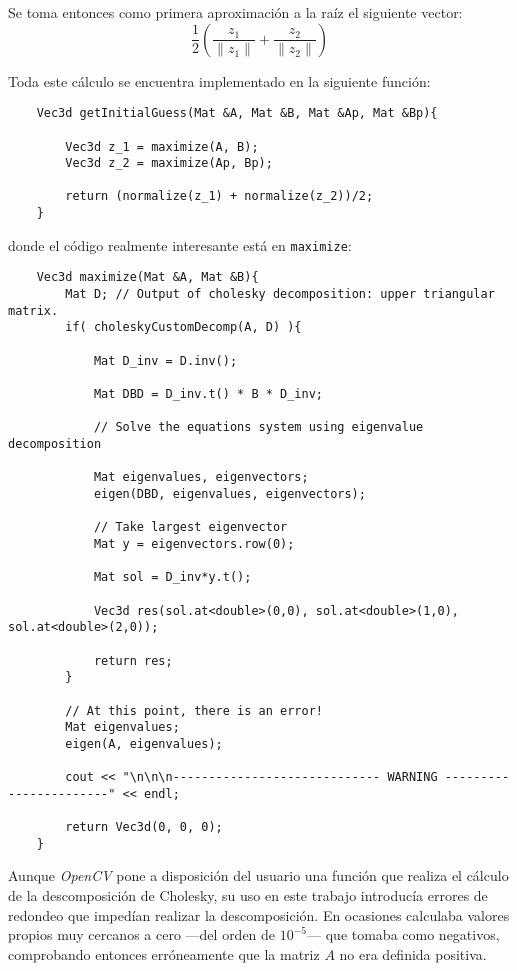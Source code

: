 \documentclass[a4paper, 11pt]{article}
\theoremstyle{definition}
\begin{document}
    Se toma entonces como primera aproximación a la raíz el siguiente vector:
    \[
    \frac{1}{2}\left(\frac{z_1}{\lVert z_1 \rVert} + \frac{z_2}{\lVert z_2 \rVert}\right)
    \]

    Toda este cálculo se encuentra implementado en la siguiente función:
    \begin{lstlisting}
    Vec3d getInitialGuess(Mat &A, Mat &B, Mat &Ap, Mat &Bp){

        Vec3d z_1 = maximize(A, B);
        Vec3d z_2 = maximize(Ap, Bp);

        return (normalize(z_1) + normalize(z_2))/2;
    }
    \end{lstlisting}

    donde el código realmente interesante está en \lstinline{maximize}:
    \begin{lstlisting}
    Vec3d maximize(Mat &A, Mat &B){
        Mat D; // Output of cholesky decomposition: upper triangular matrix.
        if( choleskyCustomDecomp(A, D) ){

            Mat D_inv = D.inv();

            Mat DBD = D_inv.t() * B * D_inv;

            // Solve the equations system using eigenvalue decomposition

            Mat eigenvalues, eigenvectors;
            eigen(DBD, eigenvalues, eigenvectors);

            // Take largest eigenvector
            Mat y = eigenvectors.row(0);

            Mat sol = D_inv*y.t();

            Vec3d res(sol.at<double>(0,0), sol.at<double>(1,0), sol.at<double>(2,0));

            return res;
        }

        // At this point, there is an error!
        Mat eigenvalues;
        eigen(A, eigenvalues);

        cout << "\n\n\n----------------------------- WARNING -----------------------" << endl;

        return Vec3d(0, 0, 0);
    }
    \end{lstlisting}

    Aunque \emph{OpenCV} pone a disposición del usuario una función que realiza el cálculo de la descomposición de Cholesky, su uso en este trabajo introducía errores de redondeo que impedían realizar la descomposición. En ocasiones calculaba valores propios muy cercanos a cero ---del orden de $10^{-5}$--- que tomaba como negativos, comprobando entonces erróneamente que la matriz $A$ no era definida positiva.
\end{document}
